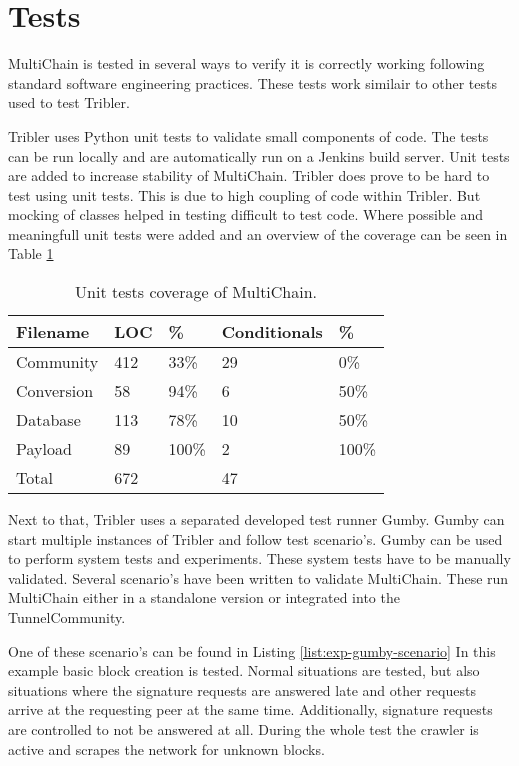 \section{Tests}
MultiChain is tested in several ways to verify it is correctly working
following standard software engineering practices.
These tests work similair to other tests used to test Tribler.

Tribler uses Python unit tests  to validate small components of code.
The tests can be run locally and
are automatically run on a Jenkins build server\cite{jenkins}\cite{jenkins-tribler}.
Unit tests are added to increase stability of MultiChain.
Tribler does prove to be hard to test using unit tests.
This is due to high coupling of code within Tribler.
But mocking of classes helped in testing difficult to test code.
Where possible and meaningfull unit tests were added and an overview of the coverage can be seen in Table \ref{tab:tests}

\begin{table}
\centering
\begin{tabular}{l|ll|ll}
Filename   & LOC & \%    & Conditionals & \%    \\ \hline
Community  & 412 & 33\%  & 29           & 0\%   \\
Conversion & 58  & 94\%  & 6            & 50\%  \\
Database   & 113 & 78\%  & 10           & 50\%  \\
Payload    & 89  & 100\% & 2            & 100\% \\ \hline
Total      & 672 &       & 47           &
\end{tabular}
\caption{Unit tests coverage of MultiChain.}
\label{tab:tests}
\end{table}

Next to that, Tribler uses a separated developed test runner Gumby.
Gumby can start multiple instances of Tribler and follow test scenario's.
Gumby can be used to perform system tests and experiments.
These system tests have to be manually validated.
Several scenario's have been written to validate MultiChain.
These run MultiChain either in a standalone version or integrated into the TunnelCommunity.

One of these scenario's can be found in Listing \ref{list:exp-gumby-scenario}
In this example basic block creation is tested.
Normal situations are tested,
but also situations where the signature requests are answered late
and other requests arrive at the requesting peer at the same time.
Additionally, signature requests are controlled to not be answered at all.
During the whole test the crawler is active and scrapes the network for unknown blocks.

